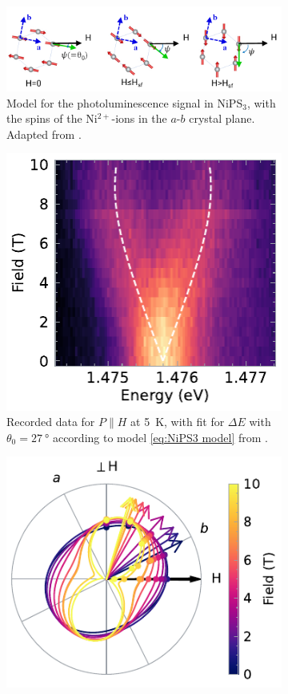 \documentclass[
	oneside,
	parskip=half,
	a4paper,
]{scrbook}
\begin{document}
\begin{figure}
	\centering
	\begin{subfigure}{\textwidth}
		\centering
		\includegraphics[width=.8\textwidth]{../figures/NiPS3_magnon_S2.png}
		\caption{Model for the photoluminescence signal in NiPS$_3$, with the spins of the Ni$^{2+}$-ions in the $a$-$b$ crystal plane. Adapted from \cite[Figure S2]{NiPS3_magnon_gap}.}
		\label{fig:NiPS3 linear model}
	\end{subfigure}
	\begin{subfigure}[t]{2.5in}
		\centering
		\includegraphics{../figures/2024-04-21 NiPS3 single polarisation.pdf}
		\caption{Recorded data for $P\parallel H$ at \SI{5}{K}, with fit for $\Delta E$ with $\theta_0 = \SI{27}{\degree}$ according to model \autoref{eq:NiPS3 model} from \cite{NiPS3_magnon_gap}.}
		\label{fig:NiPS3 model}
	\end{subfigure}
	\begin{subfigure}[t]{3in}
		\centering
		\includegraphics{../figures/2024-04-07 NiPS3 polarisation.pdf}

\end{subfigure}
\end{figure}
\end{document}
